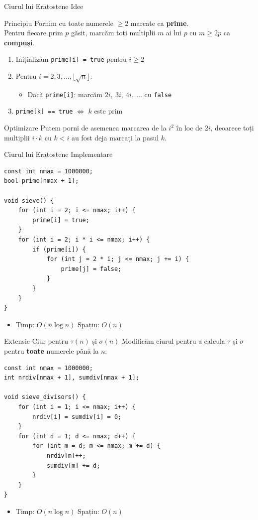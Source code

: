 ﻿\documentclass{beamer}
\begin{document}
\begin{frame}{Ciurul lui Eratostene \textemdash{} Idee}
  \begin{block}{Principiu}
    Pornim cu toate numerele $\geq 2$ marcate ca \textbf{prime}. \\
    Pentru fiecare prim $p$ găsit, marcăm toți multiplii $m$ ai lui $p$ cu $m \geq 2p$ ca \textbf{compuși}.
  \end{block}
  \bigskip
  \begin{enumerate}
    \item Inițializăm \texttt{prime[i] = true} pentru $i \geq 2$
    \item Pentru $i = 2, 3, \ldots, \lfloor\sqrt{n}\rfloor$:
    \begin{itemize}
      \item Dacă \texttt{prime[i]}: marcăm $2i,\ 3i,\ 4i,\ \ldots$ cu \texttt{false}
    \end{itemize}
    \item \texttt{prime[k] == true} $\Leftrightarrow$ $k$ este prim
  \end{enumerate}
  \medskip
  \begin{block}{Optimizare}
    Putem porni de asemenea marcarea de la $i^2$ în loc de $2i$, deoarece toți multiplii $i \cdot k$ cu $k < i$ au fost deja marcați la pasul $k$.
  \end{block}
\end{frame}

\begin{frame}{Ciurul lui Eratostene \textemdash{} Implementare}
  \begin{lstlisting}
const int nmax = 1000000;
bool prime[nmax + 1];

void sieve() {
    for (int i = 2; i <= nmax; i++) {
        prime[i] = true;
    }
    for (int i = 2; i * i <= nmax; i++) {
        if (prime[i]) {
            for (int j = 2 * i; j <= nmax; j += i) {
                prime[j] = false;
            }
        }
    }
}
  \end{lstlisting}
  \begin{itemize}
    \item Timp: $O(n \log n)$ \quad Spațiu: $O(n)$
  \end{itemize}
\end{frame}

\begin{frame}{Extensie \textemdash{} Ciur pentru $\tau(n)$ și $\sigma(n)$}
  Modificăm ciurul pentru a calcula $\tau$ și $\sigma$ pentru \textbf{toate} numerele până la $n$:
  \begin{lstlisting}
const int nmax = 1000000;
int nrdiv[nmax + 1], sumdiv[nmax + 1];

void sieve_divisors() {
    for (int i = 1; i <= nmax; i++) {
        nrdiv[i] = sumdiv[i] = 0;
    }
    for (int d = 1; d <= nmax; d++) {
        for (int m = d; m <= nmax; m += d) {
            nrdiv[m]++;
            sumdiv[m] += d;
        }
    }
}
  \end{lstlisting}
  \begin{itemize}
    \item Timp: $O(n \log n)$ \quad Spațiu: $O(n)$
  \end{itemize}
\end{frame}
\end{document}

